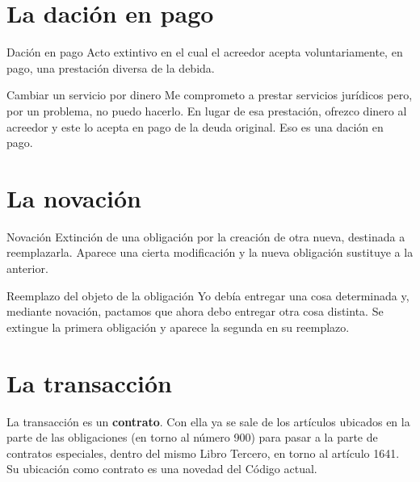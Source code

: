 \documentclass[12pt,oneside]{book}
\begin{document}
\section{La dación en pago}

\begin{definition}{Dación en pago}
Acto extintivo en el cual el acreedor acepta voluntariamente, en pago, una prestación diversa de la debida.
\end{definition}

\begin{example}{Cambiar un servicio por dinero}
Me comprometo a prestar servicios jurídicos pero, por un problema, no puedo hacerlo. En lugar de esa prestación, ofrezco dinero al acreedor y este lo acepta en pago de la deuda original. Eso es una dación en pago.
\end{example}

\section{La novación}

\begin{definition}{Novación}
Extinción de una obligación por la creación de otra nueva, destinada a reemplazarla. Aparece una cierta modificación y la nueva obligación sustituye a la anterior.
\end{definition}

\begin{example}{Reemplazo del objeto de la obligación}
Yo debía entregar una cosa determinada y, mediante novación, pactamos que ahora debo entregar otra cosa distinta. Se extingue la primera obligación y aparece la segunda en su reemplazo.
\end{example}

\section{La transacción}

La transacción es un \textbf{contrato}. Con ella ya se sale de los artículos ubicados en la parte de las obligaciones (en torno al número 900) para pasar a la parte de contratos especiales, dentro del mismo Libro Tercero, en torno al artículo 1641. Su ubicación como contrato es una novedad del Código actual.
\end{document}
